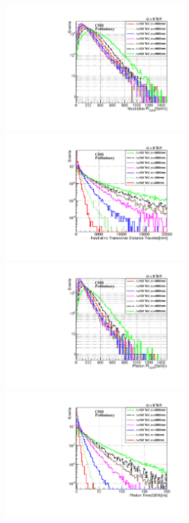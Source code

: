 \vspace{5mm}
\begin{minipage}{0.95\linewidth} 
\begin{center}
\mbox{\includegraphics[height=0.45\textwidth,width=0.5\textwidth]{THESISPLOTS/GMSB-SPS8-MODEL-Neutralinio-Pt_ctau-4000-mm.pdf} %
\includegraphics[height=0.45\textwidth,width=0.5\textwidth]{THESISPLOTS/GMSB-SPS8-MODEL-Neutralino-Proper-DecayLength_Lambda-180-TeV.pdf}} \\
\hspace{0.5cm}
\mbox{\includegraphics[height=0.45\textwidth,width=0.5\textwidth]{THESISPLOTS/GMSB-SPS8-MODEL-Photon-Pt_ctau-4000-mm.pdf} %
\includegraphics[height=0.45\textwidth,width=0.5\textwidth]{THESISPLOTS/GMSB-SPS8-MODEL-Photon-GEN-Time_Lambda-180-TeV.pdf}}

\end{center}
\end{minipage}
